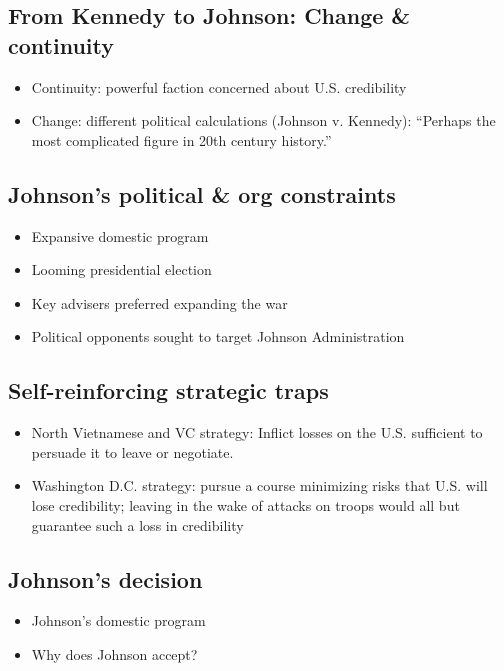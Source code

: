 \documentclass{article}
\begin{document}
\subsection{From Kennedy to Johnson: Change \& continuity}
\begin{itemize}
  \item Continuity: powerful faction concerned about U.S. credibility
  \item Change: different political calculations (Johnson v. Kennedy): ``Perhaps the most complicated figure in 20th century history.''
\end{itemize}

\subsection{Johnson's political \& org constraints}
\begin{itemize}
  \item Expansive domestic program
  \item Looming presidential election
  \item Key advisers preferred expanding the war
  \item Political opponents sought to target Johnson Administration
\end{itemize}

\subsection{Self-reinforcing strategic traps}
\begin{itemize}
  \item North Vietnamese and VC strategy: Inflict losses on the U.S. sufficient to persuade it to leave or negotiate.
  \item Washington D.C. strategy: pursue a course minimizing risks that U.S. will lose credibility; leaving in the wake of attacks on troops would all but guarantee such a loss in credibility
\end{itemize}

\subsection{Johnson's decision}
\begin{itemize}
  \item Johnson's domestic program
  \item Why does Johnson accept?
\end{itemize}
\end{document}
